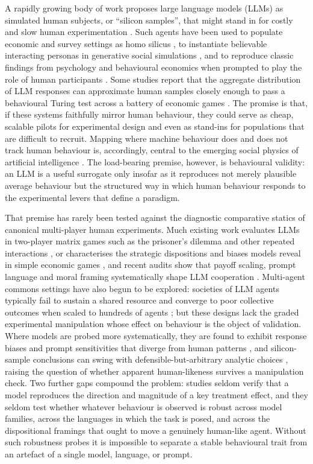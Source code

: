 \documentclass[openacc]{rsproca_new}
\begin{document}
A rapidly growing body of work proposes large language models (LLMs) as simulated human subjects, or ``silicon samples'', that might stand in for costly and slow human experimentation \cite{argyle2023out}. Such agents have been used to populate economic and survey settings as homo silicus \cite{horton2023llm}, to instantiate believable interacting personas in generative social simulations \cite{park2023generative}, and to reproduce classic findings from psychology and behavioural economics when prompted to play the role of human participants \cite{aher2023using}. Some studies report that the aggregate distribution of LLM responses can approximate human samples closely enough to pass a behavioural Turing test across a battery of economic games \cite{mei2024turing}. The promise is that, if these systems faithfully mirror human behaviour, they could serve as cheap, scalable pilots for experimental design and even as stand-ins for populations that are difficult to recruit. Mapping where machine behaviour does and does not track human behaviour is, accordingly, central to the emerging social physics of artificial intelligence \cite{han2026socialphysics}. The load-bearing premise, however, is behavioural validity: an LLM is a useful surrogate only insofar as it reproduces not merely plausible average behaviour but the structured way in which human behaviour responds to the experimental levers that define a paradigm.

That premise has rarely been tested against the diagnostic comparative statics of canonical multi-player human experiments. Much existing work evaluates LLMs in two-player matrix games such as the prisoner's dilemma and other repeated interactions \cite{akata2023playing,feng2024survey}, or characterises the strategic dispositions and biases models reveal in simple economic games \cite{brookins2023playing,huynh2025understanding}, and recent audits show that payoff scaling, prompt language and moral framing systematically shape LLM cooperation \cite{huynh2026payoff,buscemi2025communication,backmann2025ethics}. Multi-agent commons settings have also begun to be explored: societies of LLM agents typically fail to sustain a shared resource \cite{piatti2024cooperate} and converge to poor collective outcomes when scaled to hundreds of agents \cite{willis2026collective}; but these designs lack the graded experimental manipulation whose effect on behaviour is the object of validation. Where models are probed more systematically, they are found to exhibit response biases and prompt sensitivities that diverge from human patterns \cite{tjuatja2024llms}, and silicon-sample conclusions can swing with defensible-but-arbitrary analytic choices \cite{cummins2025threat}, raising the question of whether apparent human-likeness survives a manipulation check. Two further gaps compound the problem: studies seldom verify that a model reproduces the direction and magnitude of a key treatment effect, and they seldom test whether whatever behaviour is observed is robust across model families, across the languages in which the task is posed, and across the dispositional framings that ought to move a genuinely human-like agent. Without such robustness probes it is impossible to separate a stable behavioural trait from an artefact of a single model, language, or prompt.
\end{document}
